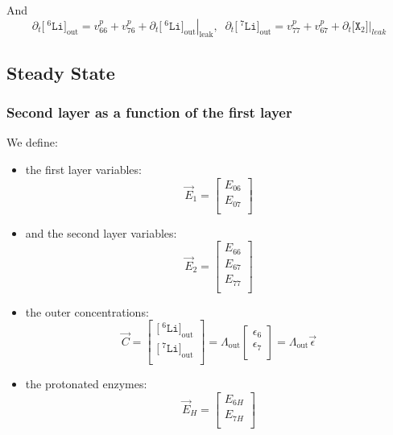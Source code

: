 \documentclass[aps,onecolumn,11pt]{revtex4}
\newcommand{\mychem}[1]{\mathtt{#1}}
\newcommand{\myconc}[1]{\big[#1\big]}
\newcommand{\spx}{\mychem{X}}
\newcommand{\spLi}[1]{{\!~^{#1}\mychem{Li}}}
\newcommand{\Li}[1]{\myconc{\spLi{#1}}}
\newcommand{\myleak}[1]{\left.{#1}\right\vert_{\mathrm{leak}}}
\newcommand{\myout}[1]{{#1}_{\mathrm{out}}}
\newcommand{\LiOut}[1]{\myout{\Li{#1}}}
\newcommand{\LiAll}{\Lambda}
\newcommand{\LiAllOut}{\myout{\LiAll}}
\begin{document}
And
\begin{equation}
	\partial_t \LiOut{6} = v^p_{66}+v^p_{76} + \partial_t \myleak{\LiOut{6}},\;\;
	\partial_t \LiOut{7} = v^p_{77}+v^p_{67} + \partial_t \myconc{\spx_2}\vert_{leak}
\end{equation}

\subsection{Steady State}


\subsubsection{Second layer as a function of the first layer}

We define:
\begin{itemize}
\item the first layer variables:
\begin{equation}
	\vec{E}_1 = \begin{bmatrix}
	E_{06}\\
	E_{07}\\
	\end{bmatrix}
\end{equation}
\item and the second layer variables:
\begin{equation}
	\vec{E}_2 = \begin{bmatrix}
	E_{66}\\
	E_{67}\\
	E_{77}\\
	\end{bmatrix}
\end{equation}
\item the outer concentrations:
\begin{equation}
	\vec{C} = 
	\begin{bmatrix}
	\LiOut{6}\\
	\LiOut{7}\\
	\end{bmatrix}
	=
	\LiAllOut
	\begin{bmatrix}
	\epsilon_6\\
	\epsilon_7\\
	\end{bmatrix}
	=
	\LiAllOut\vec{\epsilon}
\end{equation}
\item the protonated enzymes:
\begin{equation}
	\vec{E}_H = 
	\begin{bmatrix}
	E_{6H}\\
	E_{7H}\\
	\end{bmatrix}
\end{equation}

\end{itemize}
\end{document}
